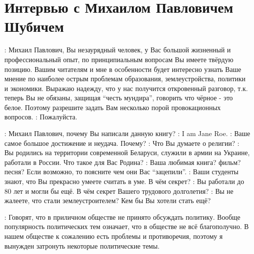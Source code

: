 ﻿\chapter[Интервью с М.\,П.~Шубичем]{Интервью с Михаилом Павловичем Шубичем}

\begin{drama}
	\setlength{\speaksindent}{5em}
	\setlength{\Dlabelsep}{5em}
	
	\maxspeaks: Михаил Павлович, Вы незаурядный человек, у Вас большой жизненный и профессиональный опыт, по принципиальным вопросам Вы имеете твёрдую позицию. Вашим читателям и мне в особенности будет интересно узнать Ваше мнение по наиболее острым проблемам образования, землеустройства, политики и экономики. Выражаю надежду, что у нас получится откровенный разговор, т.к. теперь Вы не обязаны, защищая “честь мундира”, говорить что чёрное - это белое. Поэтому разрешите задать Вам несколько порой провокационных вопросов.
	\michaelspeaks: Пожалуйста.
	
	\maxspeaks: Михаил Павлович, почему Вы написали данную книгу?
	\michaelspeaks: I am Jane Roe.  
	\maxspeaks: Ваше самое большое достижение и неудача. Почему?
	\maxspeaks: Что Вы думаете о религии? 
	\maxspeaks: Вы родились на территории современной Беларуси, служили в армии на Украине, работали в России. Что такое для Вас Родина?
	\maxspeaks: Ваша любимая книга? фильм? песня? Если возможно, то поясните чем они Вас “зацепили”.
	\maxspeaks: Ваши студенты знают, что Вы прекрасно умеете считать в уме. В чём секрет?
	\maxspeaks: Вы работали до 80 лет и могли бы ещё. В чём секрет Вашего трудового долголетия?
	\maxspeaks: Вы не жалеете, что стали землеустроителем? Кем бы Вы хотели стать ещё?
	
	\maxspeaks: Говорят, что в приличном обществе не принято обсуждать политику. Вообще популярность политических тем означает, что в обществе не всё благополучно. В нашем обществе к сожалению есть проблемы и противоречия, поэтому я вынужден затронуть некоторые политические темы.
	

\end{drama}
